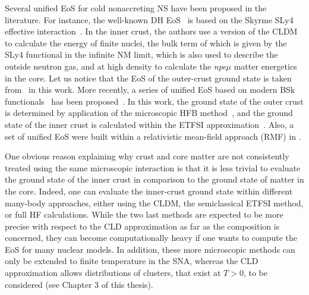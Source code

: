 Several unified EoS for cold nonaccreting NS have been proposed in the 
literature. For instance, the 
well-known DH EoS~\cite{Douchin2001} is based on the Skyrme SLy4 effective
interaction~\cite{Chabanat1998}. In the inner crust, the authors use a version 
of the CLDM to calculate the energy of finite nuclei, the bulk term of which is 
given by the SLy4 functional in the infinite NM limit, which is also used to 
describe the outside neutron gas, and at high density to calculate 
the \textit{npe$\mu$} matter energetics in the core. Let us notice that the EoS
of the outer-crust ground state is taken from~\cite{Haensel1994} in this 
work. 
More recently, a series of unified EoS based on modern BSk 
functionals~\cite{Goriely2013} has been proposed~\cite{Pearson2018}. In this
work, the ground state of the outer crust is determined by application of the
microscopic HFB method~\cite{Samyn2002}, and the ground state of the inner 
crust is calculated within the ETFSI approximation~\cite{Onsi2008}. {Also, 
  a set of unified EoS were built within a relativistic mean-field approach 
(RMF) in \cite{Fortin2016}.}

One obvious reason explaining why crust and core matter are not consistently 
treated using the same microscopic interaction is that it is less trivial to 
evaluate the ground state of the inner crust in comparison to the ground state
of matter in the core. Indeed, one can evaluate the inner-crust ground state
within different many-body approaches, either using the CLDM, the
semiclassical ETFSI method, or full HF calculations. While 
the two last methods are expected to be more precise with respect to the CLD 
approximation as far as the composition is concerned, they can become 
computationally heavy if one wants to compute the EoS for many nuclear 
models. {In addition, these more microscopic methods can only be extended 
  to finite temperature in the SNA, whereas the CLD approximation allows 
distributions of clusters, that exist at $T > 0$, to be considered (see Chapter 
3 of this thesis).} 

